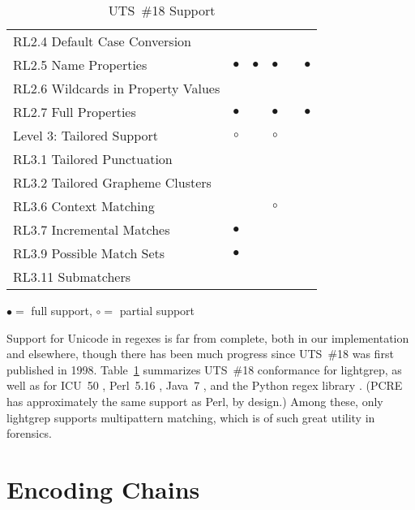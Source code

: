 \documentclass[5p,final,number,sort&compress]{elsarticle}
\begin{document}
\begin{table}
\begin{tabular}{l|c|c|c|c|c|}
RL2.4 Default Case Conversion      &           &           &           &           &           \\
RL2.5 Name Properties              & $\bullet$ & $\bullet$ & $\bullet$ &           & $\bullet$ \\
RL2.6 Wildcards in Property Values &           &           &           &           &           \\
RL2.7 Full Properties              & $\bullet$ &           & $\bullet$ &           & $\bullet$ \\
\hline
Level 3: Tailored Support          & $\circ$   &           & $\circ$   &           &           \\
\hline
RL3.1 Tailored Punctuation         &           &           &           &           &           \\
RL3.2 Tailored Grapheme Clusters   &           &           &           &           &           \\
RL3.6 Context Matching             &           &           & $\circ$   &           &           \\
RL3.7 Incremental Matches          & $\bullet$ &           &           &           &           \\
RL3.9 Possible Match Sets          & $\bullet$ &           &           &           &           \\
RL3.11 Submatchers                 &           &           &           &           &           \\
\hline
\end{tabular}

\medskip
$\bullet = $ full support, $\circ = $ partial support
\caption{UTS~\#18 Support\label{tab:uts18-support}}
\end{table}

Support for Unicode in regexes is far from complete, both in our implementation and elsewhere, though there has been much progress since UTS~\#18 was first published in 1998. Table~\ref{tab:uts18-support} summarizes UTS~\#18 conformance for lightgrep, as well as for ICU~50 \citep{icuregex}, Perl~5.16 \citep{perlunicode}, Java~7 \citep{jdk7pattern}, and the Python regex library \citep{pythonregex}. (PCRE has approximately the same support as Perl, by design.) Among these, only lightgrep supports multipattern matching, which is of such great utility in forensics.

\section{Encoding Chains}
\label{sec:chains}
\end{document}
